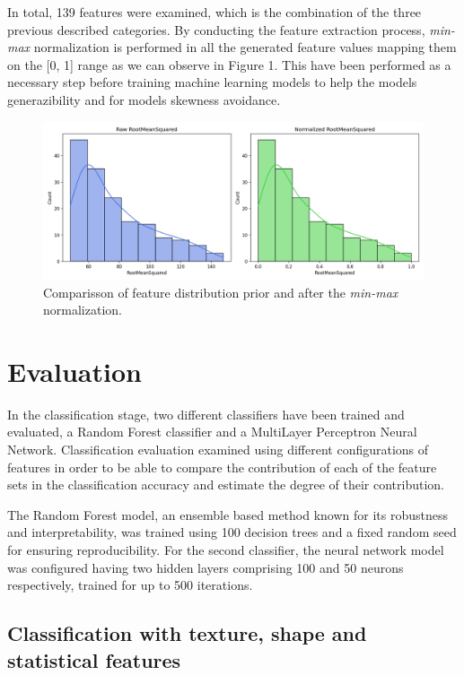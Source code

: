 \documentclass[11pt,a4paper]{article}
\begin{document}
	In total, 139 features were examined, which is the combination of the three previous described categories.
	By conducting the feature extraction process, \textit{min-max} normalization is performed in all the generated feature values
	mapping them on the [0, 1] range as we can observe in Figure 1. This have been performed as a necessary step
	before training machine learning models to help the models generazibility and for models skewness avoidance.

		\begin{figure}[h]
			\centering
			\includegraphics[width=1.1\textwidth]{images/RootMeanSquared.png}
			\caption{Comparisson of feature distribution prior and after the \textit{min-max} normalization.}
			\label{fig1:}
		\end{figure}		



    \section{Evaluation}
		
		\par In the classification stage, two different classifiers have been trained and evaluated, a Random Forest classifier
		and a MultiLayer Perceptron Neural Network. Classification evaluation examined using different configurations of features
		in order to be able to compare the contribution of each of the feature sets in the classification accuracy and estimate
		the degree of their contribution.

		The Random Forest model, an ensemble based method known for its robustness and interpretability, 
		was trained using 100 decision trees and a fixed random seed for ensuring reproducibility. 
		For the second classifier, the neural network model was configured having
		two hidden layers comprising 100 and 50 neurons respectively, trained 
		for up to 500 iterations.

	\subsection{Classification with texture, shape and statistical features}
\end{document}
